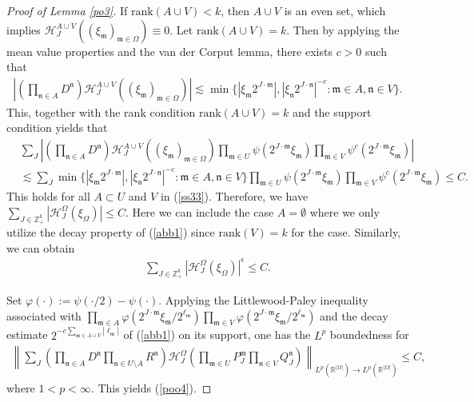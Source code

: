 \documentclass[10pt,a4paper]{amsart}
\numberwithin{equation}{section}
\begin{document}
\begin{proof}[Proof of Lemma \ref{po3}]
	If $\text{rank}(A\cup V)<k$, then $A\cup V$ is an even set, which implies $\mathcal{H}_J^{A\cup V} \left((\xi_{\mathfrak{m}} )_{\mathfrak{m}\in \Omega} \right) \equiv 0$.
	Let $\text{rank}(A\cup V)=k$. Then by applying the mean value properties and the van der Corput lemma, there exists  $c>0$ such that
	\begin{align}\label{abb1}
		\left| \left( \prod_{\mathfrak{n}\in   A} D^{\mathfrak{n}} \right)\mathcal{H}_J^{A\cup V} \left((\xi_{\mathfrak{m}} )_{\mathfrak{m}\in \Omega} \right)\right|\lesssim \min\{ |\xi_{\mathfrak{m}}2^{J\cdot \mathfrak{m}}|, |\xi_{\mathfrak{n}}2^{J\cdot \mathfrak{n}}|^{-c}: \mathfrak{m}\in A, \mathfrak{n}\in V\}.
	\end{align}
This, together with the rank condition $\text{rank}(A\cup V)=k$ and the support condition yields that
	\begin{align*}
		&\sum_{J}\left| \left( \prod_{\mathfrak{n}\in   A} D^{\mathfrak{n}} \right)\mathcal{H}_J^{A\cup V} \left((\xi_{\mathfrak{m}} )_{\mathfrak{m}\in \Omega} \right) \prod_{\mathfrak{m}\in U}  \psi \left(2^{J\cdot \mathfrak{m}} \xi_{\mathfrak{m}} \right)    \prod_{\mathfrak{m}\in V}\psi^c\left(2^{J\cdot \mathfrak{m}} \xi_{\mathfrak{m}} \right)  \right|\\
		& \lesssim  \sum_J   \min\{ |\xi_{\mathfrak{m}}2^{J\cdot \mathfrak{m}}|, |\xi_{\mathfrak{n}}2^{J\cdot \mathfrak{n}}|^{-c}: \mathfrak{m}\in A, \mathfrak{n}\in V\}\prod_{\mathfrak{m}\in U}  \psi \left(2^{J\cdot \mathfrak{m}} \xi_{\mathfrak{m}} \right)    \prod_{\mathfrak{m}\in V}\psi^c\left(2^{J\cdot \mathfrak{m}} \xi_{\mathfrak{m}} \right)\le C.
	\end{align*}
	This holds for all $A\subset U$ and $V$ in (\ref{ss33}).  Therefore, we have $\sum_{J \in \mathbb{Z}_+^k}  |\mathcal{H}^{\Omega}_{J}(\xi_{\Omega}) |  \le C. $ Here we can include the case $A=\emptyset$ where we only utilize the decay property of (\ref{abb1}) since $\text{rank}(V)= k$ for the case. Similarly, we can obtain 	\begin{align*}
		\sum_{J\in \mathbb{Z}_+^k}   |\mathcal{H}^{\Omega}_{J}(\xi_{\Omega}) |^{\epsilon} \le C. 
	\end{align*} 
	
	 Set $\varphi(\cdot):=\psi(\cdot/2)-\psi(\cdot)$.  Applying the Littlewood-Paley inequality associated with $\prod_{\mathfrak{m}\in A}  \varphi \left(2^{J\cdot \mathfrak{m}} \xi_{\mathfrak{m}} /2^{\ell_{\mathfrak{m}}}\right)    \prod_{\mathfrak{m}\in V}\varphi \left(2^{J\cdot \mathfrak{m}} \xi_{\mathfrak{m}}/2^{\ell_{\mathfrak{m}}} \right)$
	and the decay estimate $2^{-c\sum_{\mathfrak{m}\in A\cup V} |\ell_{\mathfrak{m}}|}$ of  (\ref{abb1})    on its  support, one has  the $L^p$ boundedness for
	\begin{align}
		\left\|\sum_{J} \left(\prod_{\mathfrak{n}\in   A} D^{\mathfrak{n}}\prod_{\mathfrak{n}\in U\setminus A} R^{\mathfrak{n}}\right)\mathcal{H}^{\Omega}_J \left(\prod_{\mathfrak{m}\in U}  P_J^{\mathfrak{m}}  \prod_{\mathfrak{n}\in V}Q_J^{\mathfrak{n}}\right) \right\|_{L^p(\mathbb{R}^{|\Omega|})\rightarrow L^p(\mathbb{R}^{|\Omega|})}\le C,
	\end{align}
	where $1<p<\infty$. This   yields (\ref{poo4}).
\end{proof}
\end{document}
